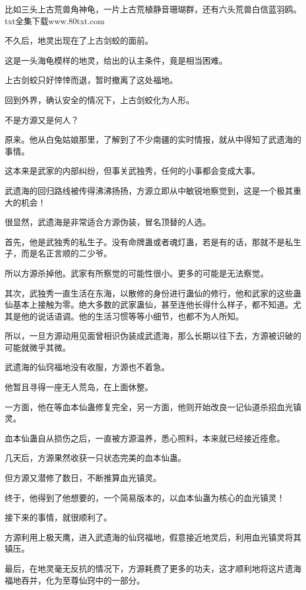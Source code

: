 \begin{this_body}
比如三头上古荒兽角神龟，一片上古荒植静音珊瑚群，还有六头荒兽白信蓝羽鸥。txt全集下载www.80txt.com

不久后，地灵出现在了上古剑蛟的面前。

这是一头海龟模样的地灵，给出的认主条件，竟是相当困难。

上古剑蛟只好悻悻而退，暂时撤离了这处福地。

回到外界，确认安全的情况下，上古剑蛟化为人形。

不是方源又是何人？

原来。他从白兔姑娘那里，了解到了不少南疆的实时情报，就从中得知了武遗海的事情。

这本来是武家的内部纠纷，但事关武独秀，任何的小事都会变成大事。

武遗海的回归路线被传得沸沸扬扬，方源立即从中敏锐地察觉到，这是一个极其重大的机会！

很显然，武遗海是非常适合方源伪装，冒名顶替的人选。

首先，他是武独秀的私生子。没有命牌蛊或者魂灯蛊，若是有的话，那就不是私生子，而是名正言顺的二少爷。

所以方源杀掉他。武家有所察觉的可能性很小。更多的可能是无法察觉。

其次，武独秀一直生活在东海，以散修的身份进行蛊仙的修行，他和武家的这些蛊仙基本上接触为零。绝大多数的武家蛊仙，甚至连他长得什么样子，都不知道。尤其是他的说话语调。他的生活习惯等等小细节，也都不为人所知。

所以，一旦方源动用见面曾相识伪装成武遗海，那么长期以往下去，方源被识破的可能就微乎其微。

武遗海的仙窍福地没有收服，方源也不着急。

他暂且寻得一座无人荒岛，在上面休整。

一方面，他在等血本仙蛊修复完全，另一方面，他则开始改良一记仙道杀招血光镇灵。

血本仙蛊自从损伤之后，一直被方源温养，悉心照料，本来就已经接近痊愈。

几天后，方源果然收获一只状态完美的血本仙蛊。

但方源又潜修了数日，不断推算血光镇灵。

终于，他得到了他想要的，一个简易版本的，以血本仙蛊为核心的血光镇灵！

接下来的事情，就很顺利了。

方源利用上极天鹰，进入武遗海的仙窍福地，假意接近地灵后，利用血光镇灵将其镇压。

最后，在地灵毫无反抗的情况下，方源耗费了更多的功夫，这才顺利地将这片遗海福地吞并，化为至尊仙窍中的一部分。


\end{this_body}
